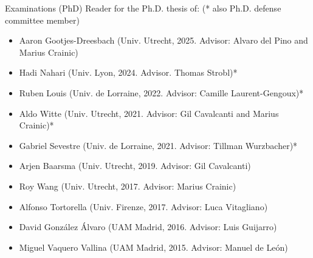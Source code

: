 \documentclass[12p]{resume}
\begin{document}
\begin{category}{Examinations (PhD)}
\citemnobullet Reader for the Ph.D. thesis  of: (* also  Ph.D. defense committee member)
\begin{itemize}
 \item  Aaron Gootjes-Dreesbach (Univ. Utrecht, 2025. Advisor: Alvaro del Pino and Marius Crainic)
 \item Hadi Nahari (Univ. Lyon, 2024. Advisor. Thomas Strobl)*
\item Ruben Louis (Univ. de Lorraine, 2022. Advisor: Camille Laurent-Gengoux)*
\item Aldo Witte (Univ. Utrecht, 2021. Advisor: Gil Cavalcanti and Marius Crainic)*
\item Gabriel Sevestre (Univ. de Lorraine, 2021. Advisor: Tillman Wurzbacher)*
\item Arjen Baarsma (Univ. Utrecht, 2019. Advisor: Gil Cavalcanti)
\item Roy Wang (Univ. Utrecht, 2017. Advisor: Marius Crainic)
\item Alfonso Tortorella (Univ. Firenze, 2017. Advisor: Luca Vitagliano)
\item David Gonz\'alez \'Alvaro (UAM Madrid, 2016. Advisor: Luis Guijarro)
\item Miguel Vaquero Vallina (UAM Madrid, 2015. Advisor: Manuel de Le\'on)    
\end{itemize}



\end{category}
\end{document}
